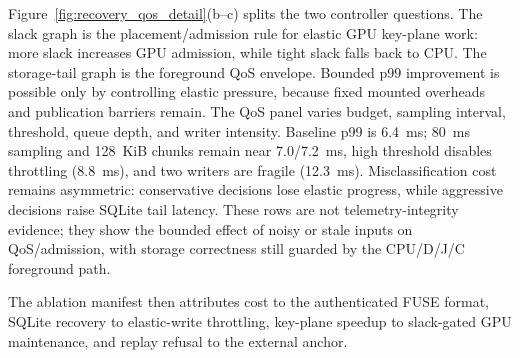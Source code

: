 Figure~\ref{fig:recovery_qos_detail}(b--c) splits the two controller questions.  The slack graph is the placement/admission rule for elastic GPU key-plane work: more slack increases GPU admission, while tight slack falls back to CPU.  The storage-tail graph is the foreground QoS envelope.  Bounded p99 improvement is possible only by controlling elastic pressure, because fixed mounted overheads and publication barriers remain.  The QoS panel varies budget, sampling interval, threshold, queue depth, and writer intensity.  Baseline p99 is 6.4~ms; 80~ms sampling and 128~KiB chunks remain near 7.0/7.2~ms, high threshold disables throttling (8.8~ms), and two writers are fragile (12.3~ms).  Misclassification cost remains asymmetric: conservative decisions lose elastic progress, while aggressive decisions raise SQLite tail latency.  These rows are not telemetry-integrity evidence; they show the bounded effect of noisy or stale inputs on QoS/admission, with storage correctness still guarded by the CPU/D/J/C foreground path.

The ablation manifest then attributes cost to the authenticated FUSE format, SQLite recovery to elastic-write throttling, key-plane speedup to slack-gated GPU maintenance, and replay refusal to the external anchor.
